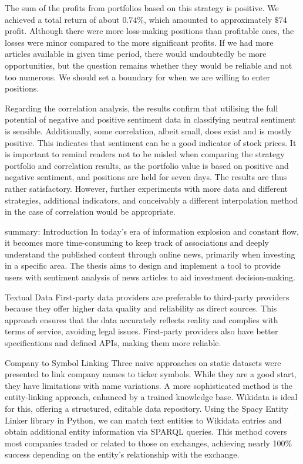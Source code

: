 The sum of the profits from portfolios based on this strategy is positive. We achieved a total return of about $0.74\%$, which amounted to approximately $\$74$ profit. Although there were more loss-making positions than profitable ones, the losses were minor compared to the more significant profits. If we had more articles available in given time period, there would undoubtedly be more opportunities, but the question remains whether they would be reliable and not too numerous. We should set a boundary for when we are willing to enter positions.

Regarding the correlation analysis, the results confirm that utilising the full potential of negative and positive sentiment data in classifying neutral sentiment is sensible. Additionally, some correlation, albeit small, does exist and is mostly positive. This indicates that sentiment can be a good indicator of stock prices. It is important to remind readers not to be misled when comparing the strategy portfolio and correlation results, as the portfolio value is based on positive and negative sentiment, and positions are held for seven days. The results are thus rather satisfactory. However, further experiments with more data and different strategies, additional indicators, and conceivably a different interpolation method in the case of correlation would be appropriate.


summary:
Introduction
In today's era of information explosion and constant flow, it becomes more time-consuming to keep track of associations and deeply understand the published content through online news, primarily when investing in a specific area. The thesis aims to design and implement a tool to provide users with sentiment analysis of news articles to aid investment decision-making. 

Textual Data
First-party data providers are preferable to third-party providers because they offer higher data quality and reliability as direct sources. This approach ensures that the data accurately reflects reality and complies with terms of service, avoiding legal issues. First-party providers also have better specifications and defined APIs, making them more reliable.

Company to Symbol Linking
Three naive approaches on static datasets were presented to link company names to ticker symbols. While they are a good start, they have limitations with name variations. A more sophisticated method is the entity-linking approach, enhanced by a trained knowledge base. Wikidata is ideal for this, offering a structured, editable data repository. Using the Spacy Entity Linker library in Python, we can match text entities to Wikidata entries and obtain additional entity information via SPARQL queries. This method covers most companies traded or related to those on exchanges, achieving nearly 100\% success depending on the entity's relationship with the exchange.

